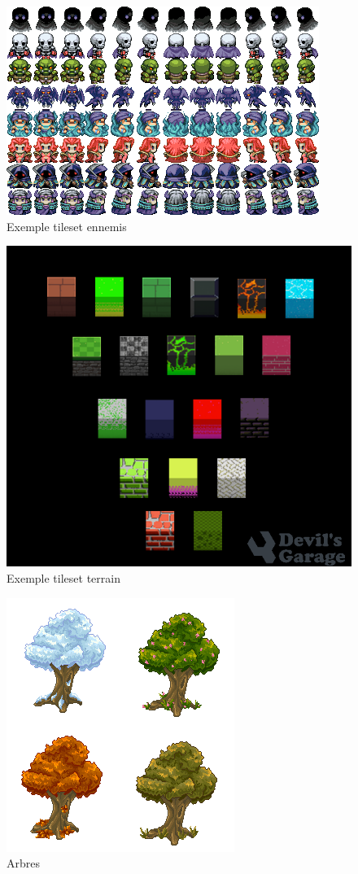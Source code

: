\documentclass[a4paper,12pt]{article}
\begin{document}
    \begin{figure}[ht]
        \centering
        \includegraphics{monsters-32x32.png}
        \caption{Exemple tileset ennemis}
    \end{figure}
    
    \begin{figure}[ht]
        \centering
        \includegraphics[width=\textwidth]{field.png}
        \caption{Exemple tileset terrain}
    \end{figure}
    
    \begin{figure} [ht]
        \centering
        \includegraphics[width=.4\linewidth]{trees.png}
        \caption{Arbres}
    \end{figure}
    
\end{document}
